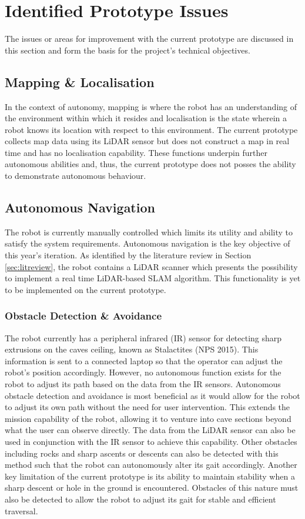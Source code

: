 \section{Identified Prototype Issues}
\label{sec:prototype-issues}
The issues or areas for improvement with the current prototype are discussed in this section and form the basis for the project's technical objectives.

\subsection{Mapping \& Localisation}
In the context of autonomy, mapping is where the robot has an understanding of the environment within which it resides and localisation is the state wherein a robot knows its location with respect to this environment. The current prototype collects map data using its LiDAR sensor but does not construct a map in real time and has no localisation capability. These functions underpin further autonomous abilities and, thus, the current prototype does not posses the ability to demonstrate autonomous behaviour.

\subsection{Autonomous Navigation}
The robot is currently manually controlled which limits its utility and ability to satisfy the system requirements. Autonomous navigation is the key objective of this year's iteration. As identified by the literature review in Section \ref{sec:litreview}, the robot contains a LiDAR scanner which presents the possibility to implement a real time LiDAR-based SLAM algorithm. This functionality is yet to be implemented on the current prototype.

\subsubsection{Obstacle Detection \& Avoidance}
The robot currently has a peripheral infrared (IR) sensor for detecting sharp extrusions on the caves ceiling, known as Stalactites (NPS 2015). This information is sent to a connected laptop so that the operator can adjust the robot's position accordingly. However, no autonomous function exists for the robot to adjust its path based on the data from the IR sensors. Autonomous obstacle detection and avoidance is most beneficial as it would allow for the robot to adjust its own path without the need for user intervention. This extends the mission capability of the robot, allowing it to venture into cave sections beyond what the user can observe directly. The data from the LiDAR sensor can also be used in conjunction with the IR sensor to achieve this capability. Other obstacles including rocks and sharp ascents or descents can also be detected with this method such that the robot can autonomously alter its gait accordingly. Another key limitation of the current prototype is its ability to maintain stability when a sharp descent or hole in the ground is encountered. Obstacles of this nature must also be detected to allow the robot to adjust its gait for stable and efficient traversal.

